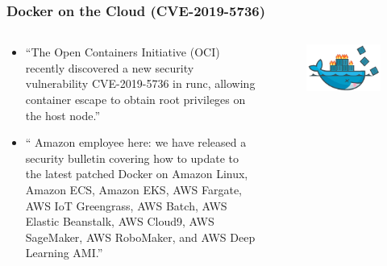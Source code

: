 \documentclass{beamer}
\begin{document}
\begin{frame}
   \frametitle{Docker on the Cloud (CVE-2019-5736)}
   \begin{columns}
      \begin{column}{0.6\textwidth}
         \begin{itemize}
            \setlength\itemsep{1.0em}
            \item ``The Open Containers Initiative (OCI) recently discovered 
               a new security vulnerability CVE-2019-5736 in runc, allowing 
               container escape to obtain root privileges on the host node.''
            \item `` Amazon employee here: we have released a security 
               bulletin covering how to update to the latest patched 
               Docker on Amazon Linux, Amazon ECS, Amazon EKS, AWS 
               Fargate, AWS IoT Greengrass, AWS Batch, AWS Elastic 
               Beanstalk, AWS Cloud9, AWS SageMaker, AWS RoboMaker, and 
               AWS Deep Learning AMI.''
         \end{itemize}
      \end{column}
      \hfill
      \begin{column}{0.5\textwidth}
         \begin{figure}[htbp]
            \includegraphics[width=1.0\textwidth]{images/docker-on-fire.png}
         \end{figure}
      \end{column}
   \end{columns}
\end{frame}
\end{document}
